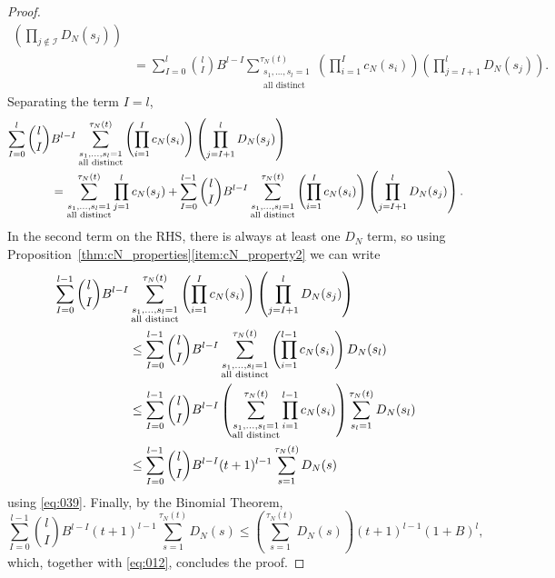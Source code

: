 \begin{proof}
\begin{align*}
        \left( \prod_{j\notin\mathcal{I}} D_N(s_j) \right) \\
&= \sum_{I=0}^l \binom{l}{I} B^{l-I} 
        \sum_{\substack{ s_1, \dots, s_l =1 \\ \text{all distinct} }}^{\tau_N(t)}
        \left( \prod_{i=1}^I c_N(s_i) \right)
        \left( \prod_{j=I+1}^l D_N(s_j) \right) .
\end{align*}
Separating the term $I=l$,
\begin{align}
\sum_{I=0}^l \binom{l}{I} &B^{l-I} 
        \sum_{\substack{ s_1, \dots, s_l =1 \\ \text{all distinct} }}^{\tau_N(t)}
        \left( \prod_{i=1}^I c_N(s_i) \right)
        \left( \prod_{j=I+1}^l D_N(s_j) \right) \notag\\
&= \sum_{\substack{ s_1, \dots, s_l =1 \\ \text{all distinct} }}^{\tau_N(t)}
        \prod_{j=1}^l c_N(s_j)
    + \sum_{I=0}^{l-1} \binom{l}{I} B^{l-I} 
        \sum_{\substack{ s_1, \dots, s_l =1 \\ \text{all distinct} }}^{\tau_N(t)}
        \left( \prod_{i=1}^I c_N(s_i) \right) \left( \prod_{j=I+1}^l D_N(s_j) \right). \label{eq:012}
\end{align}
In the second term on the RHS, there is always at least one $D_N$ term, so using Proposition~\ref{thm:cN_properties}\ref{item:cN_property2} we can write
\begin{align}
\sum_{I=0}^{l-1}\binom{l}{I} B^{l-I} 
        &\sum_{\substack{ s_1, \dots, s_l =1 \\ \text{all distinct} }}^{\tau_N(t)}
        \left( \prod_{i=1}^I c_N(s_i) \right) \left( \prod_{j=I+1}^l D_N(s_j) \right) \notag\\
&\leq \sum_{I=0}^{l-1}\binom{l}{I} B^{l-I} 
        \sum_{\substack{ s_1, \dots, s_l =1 \\ \text{all distinct} }}^{\tau_N(t)}
        \left( \prod_{i=1}^{l-1} c_N(s_i) \right) D_N(s_l) \notag\\
&\leq \sum_{I=0}^{l-1}\binom{l}{I} B^{l-I} 
        \left( \sum_{\substack{ s_1, \dots, s_l =1 \\ \text{all distinct} }}^{\tau_N(t)}
        \prod_{i=1}^{l-1} c_N(s_i) \right) 
        \sum_{s_l=1}^{\tau_N(t)} D_N(s_l) \notag\\
&\leq \sum_{I=0}^{l-1}\binom{l}{I} B^{l-I} (t+1)^{l-1}
        \sum_{s=1}^{\tau_N(t)} D_N(s) \label{eq:013}
\end{align}
using \eqref{eq:039}.
Finally, by the Binomial Theorem,
\begin{equation}\label{eq:014}
\sum_{I=0}^{l-1}\binom{l}{I} B^{l-I} (t+1)^{l-1}
        \sum_{s=1}^{\tau_N(t)} D_N(s)
\leq \left( \sum_{s=1}^{\tau_N(t)} D_N(s) \right) (t+1)^{l-1} (1+B)^l ,
\end{equation}
which, together with \eqref{eq:012}, concludes the proof.
\end{proof}


